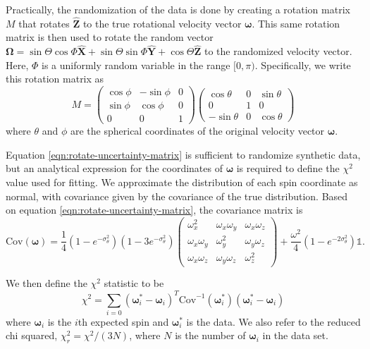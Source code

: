 \documentclass[linenumbers]{aastex631}
\newcommand{\unit}[1]{\hat{\mathbf{#1}}}
\newcommand{\parens}[1]{\left( #1 \right)}
\begin{document}
Practically, the randomization of the data is done by creating a rotation matrix $M$ that rotates $\unit Z$ to the true rotational velocity vector $\mathbf \omega$. This same rotation matrix is then used to rotate the random vector $\mathbf \Omega = \sin \Theta \cos\Phi \unit X + \sin \Theta \sin \Phi\unit Y + \cos \Theta\unit Z$ to the randomized velocity vector. Here, $\Phi$ is a uniformly random variable in the range $[0, \pi)$. Specifically, we write this rotation matrix as
\begin{equation}
M = \parens{\begin{array}{ccc}
\cos \phi & -\sin \phi & 0\\
\sin \phi & \cos \phi & 0\\
0 & 0 & 1
\end{array}}
\parens{\begin{array}{ccc}
\cos \theta & 0 & \sin \theta \\
0 & 1 & 0\\
-\sin \theta & 0 & \cos \theta
\end{array}}
\label{eqn:rotate-uncertainty-matrix}
\end{equation}
where $\theta$ and $\phi$ are the spherical coordinates of the original velocity vector $\mathbf \omega.$

Equation \ref{eqn:rotate-uncertainty-matrix} is sufficient to randomize synthetic data, but an analytical expression for the coordinates of $\mathbf \omega$ is required to define the $\chi^2$ value used for fitting. We approximate the distribution of each spin coordinate as normal, with covariance given by the covariance of the true distribution. Based on equation \ref{eqn:rotate-uncertainty-matrix}, the covariance matrix is
\begin{equation}
\text{Cov}(\mathbf \omega) = \frac{1}{4}\parens{1-e^{-\sigma_\theta^2}} \parens{1-3e^{-\sigma_\theta^2}}\parens{\begin{array}{ccc}
\omega_x^2 & \omega_x \omega_y& \omega_x \omega_z\\
\omega_x \omega_y & \omega_y^2 & \omega_y \omega_z\\
\omega_x \omega_z & \omega_y \omega_z& \omega_z^2
\end{array}} +  \frac{\omega^2}{4}\parens{1 - e^{-2\sigma_\theta^2}} \mathds{1}.
\label{eqn:rotate-uncertainty-var}
\end{equation}

We then define the $\chi^2$ statistic to be
\begin{equation}
\chi^2 = \sum_{i=0} (\mathbf \omega_i^* - \mathbf \omega_i)^T\text{Cov}^{-1}(\mathbf\omega^*_i)(\mathbf \omega_i^* - \mathbf \omega_i)
\label{eqn:chisq-nominal}
\end{equation}
where $\mathbf \omega_i$ is the $i$th expected spin and $\mathbf \omega_i^*$ is the data. We also refer to the reduced chi squared, $\chi^2_r = \chi^2 / (3N)$, where $N$ is the number of $\mathbf \omega_i$ in the data set.
\end{document}
